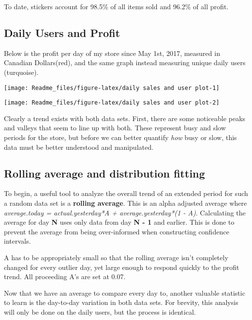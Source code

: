 \documentclass[]{article}
\begin{document}
To date, stickers account for 98.5\% of all items sold and 96.2\% of all
profit.

\subsection{Daily Users and Profit}\label{daily-users-and-profit}

Below is the profit per day of my store since May 1st, 2017, measured in
Canadian Dollars(red), and the same graph instead measuring unique daily
users (turquoise).

\begin{center}\texttt{[image: Readme\_files/figure-latex/daily sales and user plot-1]} \end{center}

\begin{center}\texttt{[image: Readme\_files/figure-latex/daily sales and user plot-2]} \end{center}

Clearly a trend exists with both data sets. First, there are some
noticeable peaks and valleys that seem to line up with both. These
represent busy and slow periods for the store, but before we can better
quantify \emph{how} busy or slow, this data must be better understood
and manipulated.

\subsection{Rolling average and distribution
fitting}\label{rolling-average-and-distribution-fitting}

To begin, a useful tool to analyze the overall trend of an extended
period for such a random data set is a \textbf{rolling average}. This is
an alpha adjusted average where \emph{average.today = actual.yesterday*A
+ average.yesterday*(1 - A)}. Calculating the average for day \textbf{N}
uses only data from day \textbf{N - 1} and earlier. This is done to
prevent the average from being over-informed when constructing
confidence intervals.

A has to be appropriately small so that the rolling average isn't
completely changed for every outlier day, yet large enough to respond
quickly to the profit trend. All proceeding A's are set at 0.07.

Now that we have an average to compare every day to, another valuable
statistic to learn is the day-to-day variation in both data sets. For
brevity, this analysis will only be done on the daily users, but the
process is identical.
\end{document}

